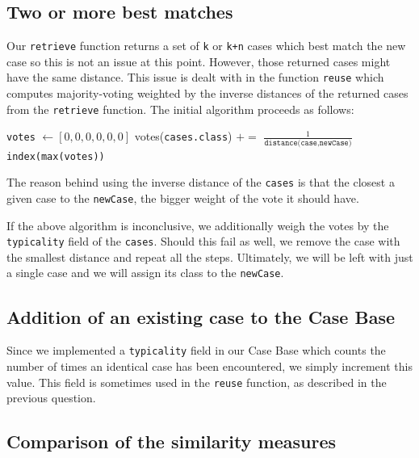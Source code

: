 \documentclass[a4paper]{article}
\begin{document}
\subsection{Two or more best matches}

Our \texttt{retrieve} function returns a set of \texttt{k} or \texttt{k+n} cases which best match the new case so this is not an issue at this point. However, those returned cases might have the same distance. This issue is dealt with in the function \texttt{reuse} which computes majority-voting weighted by the inverse distances of the returned cases from the \texttt{retrieve} function. The initial algorithm proceeds as follows: \medskip
\begin{algorithmic}
\State \texttt{votes} $\gets [0,0,0,0,0,0]$
     	\State votes(\texttt{cases.class}) $+=$ $\frac{1}{\texttt{distance(case,newCase})}$
     \EndFor \\
\Return \texttt{index(max(votes))} 
\end{algorithmic} \medskip
The reason behind using the inverse distance of the \texttt{cases} is that the closest a given case to the \texttt{newCase}, the bigger weight of the vote it should have.\medskip

If the above algorithm is inconclusive, we additionally weigh the votes by the \texttt{typicality} field of the \texttt{cases}. Should this fail as well, we remove the case with the smallest distance and repeat all the steps. Ultimately, we will be left with just a single case and we will assign its class to the \texttt{newCase}.

\subsection{Addition of an existing case to the Case Base}

Since we implemented a \texttt{typicality} field in our Case Base which counts the number of times an identical case has been encountered, we simply increment this value. This field is sometimes used in the \texttt{reuse} function, as described in the previous question.

\subsection{Comparison of the similarity measures}
\end{document}

